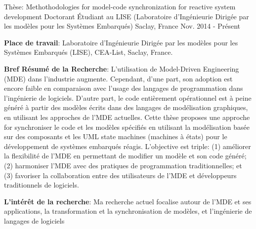 


\begin{cventries}


\cventry
{Thèse: Methothodologies for model-code synchronization for reactive system development} %
{Doctorant Étudiant au LISE (Laboratoire d'Ingénieurie Dirigée par les modèles pour les Systèmes Embarqués)} %
{Saclay, France} %
{Nov. 2014 - Présent} %
{ %
	\begin{cvitems}
		\item {\textbf{Place de travail}: Laboratoire d'Ingénieurie Dirigée par les modèles pour les Systèmes Embarqués (LISE), CEA-List, Saclay, France.}	
		\item {\textbf{Bref Résumé de la Recherche}: L'utilisation de Model-Driven Engineering (MDE) dans l'industrie augmente. Cependant, d'une part, son adoption est encore faible en comparaison avec l'usage des langages de programmation dans l'ingénierie de logiciels. D'autre part, le code entièrement opérationnel est à peine généré à partir des modèles écrits dans des langages de modélisation graphiques, en utilisant les approches de l'MDE actuelles. Cette thèse proposes une approche for synchroniser le code et les modèles spécifiés en utilisant la modélisation basée sur des composants et les UML state machines (machines à états) pour le développement de systèmes embarqués réagis. 
		L'objective est triple: (1) améliorer la flexibilité de l'MDE en permettant de modifier un modèle et son code généré; (2) harmoniser l'MDE avec des pratiques de programmation traditionnelles; et (3) favoriser la collaboration entre des utilisateurs de l'MDE et développeurs traditionnels de logiciels.} 	
		\item {\textbf{L'intérêt de la recherche}: Ma recherche actuel focalise autour de l'MDE et ses applications, la transformation et la synchronisation de modèles, et l'ingénierie de langages de logiciels}
	\end{cvitems}
}


\end{cventries}
